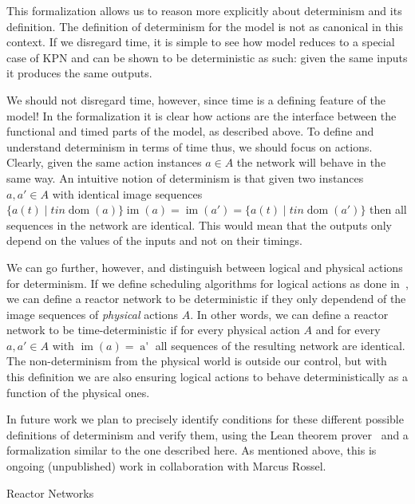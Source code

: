 This formalization allows us to reason more explicitly about determinism and its definition.
The definition of determinism for the model is not as canonical in this context.
If we disregard time, it is simple to see how model reduces to a special case of \ac{KPN} and can be shown to be deterministic as such: 
given the same inputs it produces the same outputs.

We should not disregard time, however, since time is a defining feature of the model!
In the formalization it is clear how actions are the interface between the functional and timed parts of the model, as described above.
To define and understand determinism in terms of time thus, we should focus on actions.
Clearly, given the same action instances $a \in A$ the network will behave in the same way.
An intuitive notion of determinism is that given two instances $a, a' \in A$ with identical image sequences $\{ a(t) \mid t in \operatorname{dom}(a) \} \operatorname{im}(a) = \operatorname{im}(a') = \{ a(t) \mid t in \operatorname{dom}(a') \}$ then all sequences in the network are identical.
This would mean that the outputs only depend on the values of the inputs and not on their timings.

We can go further, however, and distinguish between logical and physical actions for determinism. 
If we define scheduling algorithms for logical actions as done in~\cite{lohstroh_cyphy19,lohstroh_phdthesis}, we can define a reactor network to be deterministic if they only dependend of the image sequences of \emph{physical} actions $A$.
In other words, we can define a reactor network to be time-deterministic if for every physical action $A$ and for every $a, a' \in A$ with $\operatorname{im}(a) = \operatorname{a'}$ all sequences of the resulting network are identical.
The non-determinism from the physical world is outside our control, but with this definition we are also ensuring logical actions to behave deterministically as a function of the physical ones. 

In future work we plan to precisely identify conditions for these different possible definitions of determinism and verify them, using the Lean theorem prover~\cite{lean} and a formalization similar to the one described here.
As mentioned above, this is ongoing (unpublished) work in collaboration with Marcus Rossel.

Reactor Networks


